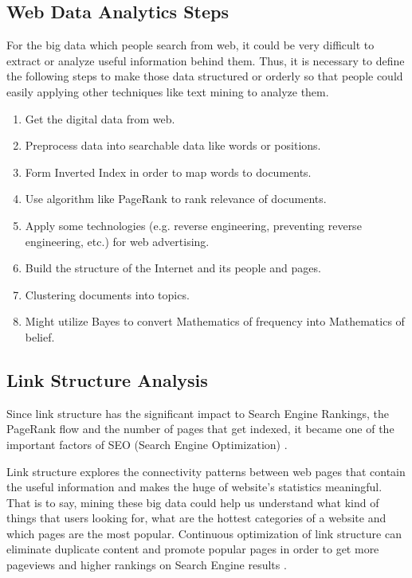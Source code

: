 \documentclass[sigconf]{acmart}
\begin{document}
\subsection{Web Data Analytics Steps}
For the big data which people search from web, it could be very difficult to extract or analyze useful information behind them. Thus, it is necessary to define the following steps to make those data structured or orderly so that people could easily applying other techniques like text mining to analyze them.
\begin{enumerate}
\item Get the digital data from web.
\item Preprocess data into searchable data like words or positions.
\item Form Inverted Index in order to map words to documents.
\item Use algorithm like PageRank to rank relevance of documents.
\item Apply some technologies (e.g. reverse engineering, preventing reverse engineering, etc.) for web advertising.
\item Build the structure of the Internet and its people and pages.
\item Clustering documents into topics.
\item Might utilize Bayes to convert Mathematics of frequency into Mathematics of belief.
\end{enumerate}

\subsection{Link Structure Analysis}
Since link structure has the significant impact to Search Engine Rankings, the PageRank flow and the number of pages that get indexed, it became one of the important factors of SEO (Search Engine Optimization) \cite{editor08}.

Link structure explores the connectivity patterns between web pages that contain the useful information and makes the huge of website’s statistics meaningful. That is to say, mining these big data could help us understand what kind of things that users looking for, what are the hottest categories of a website and which pages are the most popular. Continuous optimization of link structure can eliminate duplicate content and promote popular pages in order to get more pageviews and higher rankings on Search Engine results \cite{editor08}.
\end{document}
